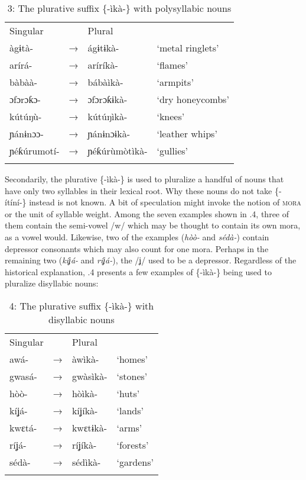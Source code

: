 \begin{table}
\caption{3: The plurative suffix \{-ìkà-\} with polysyllabic nouns}
\label{tab:4}


\begin{tabularx}{\textwidth}{XXXX}
\lsptoprule

Singular &  & Plural & \\
àgɨtà- & → & ágɨtɨkà- & ‘metal ringlets’\\
arírá- & → & aríríkà- & ‘flames’\\
bàbàà- & → & bábàìkà- & ‘armpits’\\
ɔfɔrɔƙɔ- & → & ɔfɔrɔƙɨkà- & ‘dry honeycombs’\\
kútúŋù- & → & kútúŋìkà- & ‘knees’\\
ɲánɨnɔɔ- & → & ɲánɨnɔɨkà- & ‘leather whips’\\
ɲéƙúrumotí- & → & ɲéƙúrùmòtìkà- & ‘gullies’\\
\lspbottomrule
\end{tabularx}
\end{table}
Secondarily, the plurative \{-ìkà-\} is used to pluralize a handful of nouns that have only two syllables in their lexical root. Why these nouns do not take \{-ítíní-\} instead is not known. A bit of speculation might invoke the notion of \textsc{mora} or the unit of syllable weight. Among the seven examples shown in .4, three of them contain the semi-vowel /w/ which may be thought to contain its own mora, as a vowel would. Likewise, two of the examples (\textit{hòò-} and \textit{sédà-}) contain depressor consonants which may also count for one mora. Perhaps in the remaining two (\textit{kíʝá- }and \textit{ríʝá-}), the /ʝ/ used to be a depressor. Regardless of the historical explanation, .4 presents a few examples of \{-ìkà-\} being used to pluralize disyllabic nouns:


\begin{table}
\caption{4: The plurative suffix \{-ìkà-\} with disyllabic nouns}
\label{tab:4}


\begin{tabularx}{\textwidth}{XXXX}
\lsptoprule

Singular &  & Plural & \\
awá- & → & àwìkà- & ‘homes’\\
gwasá- & → & gwàsìkà- & ‘stones’\\
hòò- & → & hòìkà- & ‘huts’\\
kíʝá- & → & kíʝíkà- & ‘lands’\\
kwɛtá- & → & kwɛtɨkà- & ‘arms’\\
ríʝá- & → & ríʝíkà- & ‘forests’\\
sédà- & → & sédìkà- & ‘gardens’\\
\lspbottomrule
\end{tabularx}
\end{table}

